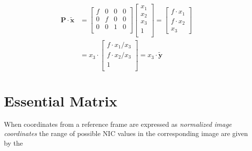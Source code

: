 \documentclass{report}
\begin{document}
\begin{equation*}
\begin{split}
\mathbf{P}\cdot\mathbf{\tilde{x}}&=
\begin{bmatrix}
f & 0 & 0 & 0\\
0 & f & 0 & 0\\
0 & 0 & 1 & 0\\
\end{bmatrix}\begin{bmatrix}x_1\\x_2\\x_3\\1\\\end{bmatrix}
=\begin{bmatrix}
f\cdot x_1\\
f\cdot x_2\\
x_3
\end{bmatrix}\\
&=
x_3\cdot\begin{bmatrix}
f\cdot x_1/x_3\\
f\cdot x_2/x_3\\
1\\
\end{bmatrix}
=x_3\cdot\mathbf{\tilde{y}}
\end{split}
\end{equation*} 

\section{Essential Matrix}

\par When coordinates from a reference frame are expressed as \textit{normalized image coordinates} the range of possible NIC values in the corresponding image are given by the 

\end{document}
